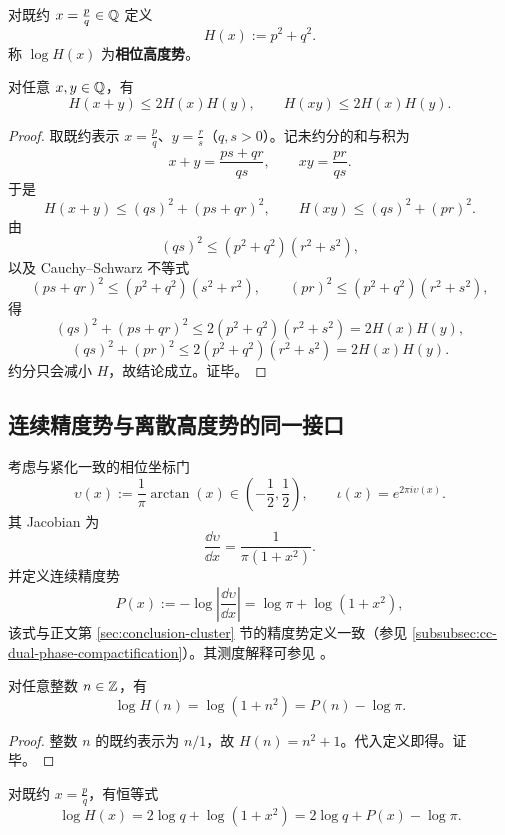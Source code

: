 \begin{definition}[相位高度与离散精度势]\label{def:app29-height}
对既约 $x=\frac{p}{q}\in\mathbb{Q}$ 定义
$$
H(x):=p^2+q^2.
$$
称 $\log H(x)$ 为\textbf{相位高度势}。
\end{definition}

\begin{theorem}[相位高度在四则闭包下的乘性上界]\label{thm:app29-height-budget}
对任意 $x,y\in\mathbb{Q}$，有
$$
H(x+y)\le 2H(x)H(y),\qquad
H(xy)\le 2H(x)H(y).
$$
\end{theorem}

\begin{proof}
取既约表示 $x=\frac{p}{q}$、$y=\frac{r}{s}$（$q,s>0$）。记未约分的和与积为
$$
x+y=\frac{ps+qr}{qs},\qquad xy=\frac{pr}{qs}.
$$
于是
$$
H(x+y)\le (qs)^2+(ps+qr)^2,\qquad
H(xy)\le (qs)^2+(pr)^2.
$$
由
$$
(qs)^2\le (p^2+q^2)(r^2+s^2),
$$
以及 Cauchy--Schwarz 不等式
$$
(ps+qr)^2\le (p^2+q^2)(s^2+r^2),\qquad
(pr)^2\le (p^2+q^2)(r^2+s^2),
$$
得
$$
(qs)^2+(ps+qr)^2\le 2(p^2+q^2)(r^2+s^2)=2H(x)H(y),
$$
$$
(qs)^2+(pr)^2\le 2(p^2+q^2)(r^2+s^2)=2H(x)H(y).
$$
约分只会减小 $H$，故结论成立。证毕。
\end{proof}

\subsection{连续精度势与离散高度势的同一接口}\label{subsec:app29-continuous-discrete}

考虑与紧化一致的相位坐标门
$$
\upsilon(x):=\frac{1}{\pi}\arctan(x)\in\left(-\frac12,\frac12\right),
\qquad
\iota(x)=e^{2\pi i\upsilon(x)}.
$$
其 Jacobian 为
$$
\frac{\dd\upsilon}{\dd x}=\frac{1}{\pi(1+x^2)}.
$$
并定义连续精度势
$$
P(x):=-\log\left|\frac{\dd\upsilon}{\dd x}\right|
=\log\pi+\log(1+x^2),
$$
该式与正文第 \ref{sec:conclusion-cluster} 节的精度势定义一致（参见 \ref{subsubsec:cc-dual-phase-compactification}）。其测度解释可参见 \cite{TangentHalfAngleWiki}。

\begin{theorem}[整数层面的严格同构]\label{thm:app29-integer-potential}
对任意整数 $n\in\mathbb{Z}$，有
$$
\log H(n)=\log(1+n^2)=P(n)-\log\pi.
$$
\end{theorem}

\begin{proof}
整数 $n$ 的既约表示为 $n/1$，故 $H(n)=n^2+1$。代入定义即得。证毕。
\end{proof}

\begin{theorem}\label{thm:app29-rational-potential-split}
对既约 $x=\frac{p}{q}$，有恒等式
$$
\log H(x)=2\log q+\log(1+x^2)
=2\log q+P(x)-\log\pi.
$$
\end{theorem}

